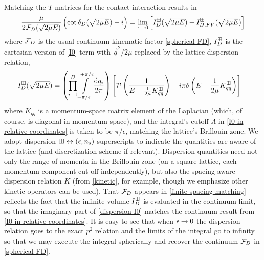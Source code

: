 Matching the $T$-matrices for the contact interaction results in
\begin{equation}
    \label{eq:finite spacing matching}
    \frac{\mu}{2 \mathcal{F}_D(\sqrt{2\mu E})}\left(\cot\delta_D(\sqrt{2\mu E})-i\right)
    =
    \lim_{\epsilon\rightarrow0}
    \left[
    	I_D^{\boxplus}(\sqrt{2\mu E}) - I_{D,FV}^{\boxplus}(\sqrt{2\mu E})
	\right]
\end{equation}
where $\mathcal{F}_D$ is the usual continuum kinematic factor \eqref{spherical FD}, $I_D^{\boxplus}$ is the cartesian version of \eqref{I0} term with $\vec{q}^2/2\mu$ replaced by the lattice dispersion relation,
\begin{align}
	\label{eq:dispersion I0}
    I_D^{\boxplus}(\sqrt{2 \mu E})
    &=
    \left(\prod_{i=1}^D
    \int\limits_{-\pi/\epsilon}^{+\pi/\epsilon}
    \frac{\mathrm{d} q_i}{2\pi}
    \right)
        \left[
            \mathcal{P} \left(
                \frac{1}{
                    E - \frac{1}{2\mu} K_{qq}^\boxplus }
                \right)
            -i \pi \delta\left(E - \frac{1}{2\mu}K_{qq}^\boxplus\right)
        \right]
\end{align}
where $K_{qq}$ is a momentum-space matrix element of the Laplacian (which, of course, is diagonal in momentum space), and the integral's cutoff $\Lambda$ in \eqref{I0 in relative coordinates} is taken to be $\pi/\epsilon$, matching the lattice's Brillouin zone.
We adopt dispersion $\boxplus \leftrightarrow (\epsilon, {n_s})$ superscripts to indicate the quantities are aware of the lattice (and discretization scheme if relevant).
Dispersion quantities need not only the range of momenta in the Brillouin zone (on a square lattice, each momentum component cut off independently), but also the spacing-aware dispersion relation $K$ (from \eqref{kinetic}, for example, though we emphasize other kinetic operators can be used).
That $\mathcal{F}_D$ appears in \eqref{finite spacing matching} reflects the fact that the infinite volume $I_D^{\boxplus}$ is evaluated in the continuum limit, so that the imaginary part of \eqref{dispersion I0} matches the continuum result from \eqref{I0 in relative coordinates}.
It is easy to see that when $\epsilon\rightarrow0$ the dispersion relation goes to the exact $p^2$ relation and the limits of the integral go to infinity so that we may execute the integral spherically and recover the continuum $\mathcal{F}_D$ in \eqref{spherical FD}.

